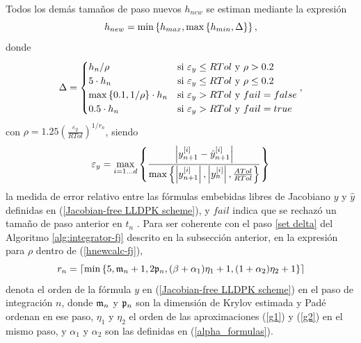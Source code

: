Todos los demás tamaños de paso nuevos $h_{new}$ se estiman mediante la expresión
\begin{equation}
    h_{new} = \min\left\{ h_{max},\max\left\{ h_{min},\Delta \right\} \right\}, \label{hnewcalc-fj}
\end{equation}
donde
\begin{equation*}
    \Delta = \begin{cases}
        h_n/\rho & \text{si } \varepsilon_y\leq RTol \text{ y } \rho>0\mathord{.}2\\
        5\cdot h_n & \text{si } \varepsilon_y\leq RTol \text{ y } \rho\leq 0\mathord{.}2\\
        \max\left\{ 0\mathord{.}1,1/\rho \right\}\cdot h_n & \text{si } \varepsilon_y > RTol \text{ y } fail=false\\
        0\mathord{.}5\cdot h_n & \text{si } \varepsilon_y > RTol \text{ y } fail=true
        \end{cases},
\end{equation*}
con  $\rho = 1\mathord{.}25 \left( \frac{\varepsilon_y}{RTol} \right)^{1/r_n}$, siendo
\begin{equation}\label{epsilon_y-fj}
	\varepsilon_y =  \max_{i=1\ldots d}\left\{ \frac{\left\lvert y^{[i]}_{n+1}-\hat{y}^{[i]}_{n+1} \right\rvert}
	{\max\left\{ \left\lvert y^{[i]}_{n+1}  \right\rvert,\left\lvert y^{[i]}_{n}\right\rvert,\frac{ATol}{RTol} \right\}} \right\}
\end{equation}
la medida de error relativo entre las fórmulas embebidas libres de Jacobiano $y$ y $\hat y$ definidas en (\ref{Jacobian-free LLDPK scheme}), y $fail$ indica que se rechazó un tamaño de paso anterior en $t_n$ . Para ser coherente con el paso \ref{set delta} del Algoritmo \ref{alg:integrator-fj} descrito en la subsección anterior, en la expresión para $\rho$ dentro de (\ref{hnewcalc-fj}),
\[r_n=\lceil\mathrm{min}\left\{5,\mathfrak{m}_{n}+1,2\mathfrak{p}_{n},(\beta+\alpha_1)\eta_1+1,(1+\alpha_2)\eta_2+1 \right\}\rceil\]
denota el orden de la fórmula $y$ en (\ref{Jacobian-free LLDPK scheme}) en el paso de integración $n$, donde $\mathfrak{m}_{n}$ y $\mathfrak{p}_{n}$ son la dimensión de Krylov estimada y Padé ordenan en ese paso, $\eta_1$ y $\eta_2$ el orden de las aproximaciones (\ref{g1}) y (\ref{g2}) en el mismo paso, y
$\alpha_1$ y $\alpha_2$ son las definidas en (\ref{alpha_formulas}).

